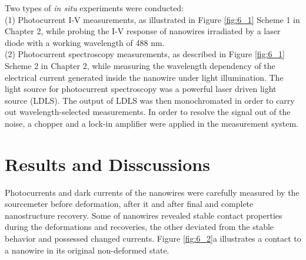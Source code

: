 Two types of {\em in situ} experiments were conducted:\\
(1) Photocurrent I-V measurements, as illustrated in Figure \ref{fig:6_1} Scheme 1 in Chapter 2, while probing the I-V response of nanowires irradiated by a laser diode with a working wavelength of 488 nm. \\

(2) Photocurrent spectroscopy measurements, as described in Figure \ref{fig:6_1} Scheme 2 in Chapter 2, while measuring the wavelength dependency of the electrical current generated inside the nanowire under light illumination. 
The light source for photocurrent spectroscopy was a powerful laser driven light source (LDLS). The output of LDLS was then monochromated in order to carry out wavelength-selected measurements. 
In order to resolve the signal out of the noise, a chopper and a lock-in amplifier were applied in the measurement system. \\

\section{Results and Disscussions}
Photocurrents and dark currents of the nanowires were carefully measured by the sourcemeter before deformation, after it and after final and complete nanostructure recovery. 
Some of nanowires revealed stable contact properties during the deformations and recoveries, the other deviated from the stable behavior and possessed changed currents. 
Figure \ref{fig:6_2}a illustrates a contact to a nanowire in its original non-deformed state. \\

